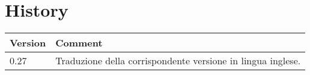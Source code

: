 \chapter{History}

\begin{tabular}{|p{}|p{}|}
\hline 
Version&
Comment\tabularnewline
\hline
\hline 
0.27 &
Traduzione della corrispondente versione in lingua inglese.\tabularnewline
\hline
\end{tabular}
